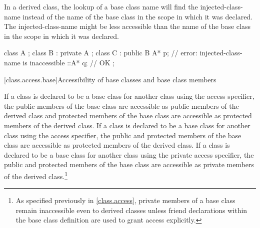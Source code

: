 \pnum
\begin{note}
In a derived class, the lookup of a base class name will find the
injected-class-name instead of the name of the base class in the scope
in which it was declared. The injected-class-name might be less accessible
than the name of the base class in the scope in which it was declared.
\end{note}

\begin{example}
\begin{codeblock}
class A { };
class B : private A { };
class C : public B {
  A* p;             // error: injected-class-name  is inaccessible
  ::A* q;           // OK
};
\end{codeblock}
\end{example}

[class.access.base]{Accessibility of base classes and base class members}%
%
%
%
%

\pnum
If a class is declared to be a base class for another class using the
access specifier, the
public members of the base class are accessible as
public members of the derived class and
protected members of the base class are accessible as
protected members of the derived class.
If a class is declared to be a base class for another class using the
access specifier, the
public and protected members of the base class are accessible as
protected members of the derived class.
If a class is declared to be a base class for another class using the
private
access specifier, the
public and protected
members of the base class are accessible as private
members of the derived class.\footnote{As specified previously in \ref{class.access},
private members of a base class remain inaccessible even to derived classes
unless friend
declarations within the base class definition are used to grant access explicitly.}

